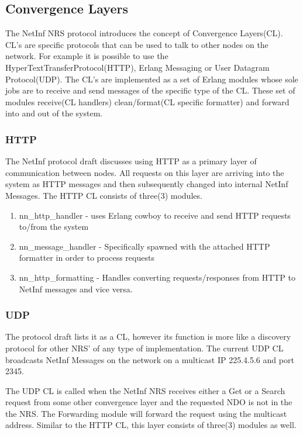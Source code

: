 \subsection {Convergence Layers}
\label{CL}
The NetInf NRS protocol introduces the concept of Convergence Layers(CL). CL's are specific protocols that can be used to talk to other nodes on the network. For example it is possible to use the HyperTextTransferProtocol(HTTP), Erlang Messaging or User Datagram Protocol(UDP). The CL's are implemented as a set of Erlang modules whose sole jobs are to receive and send messages of the specific type of the CL. These set of modules receive(CL handlers) clean/format(CL specific formatter) and forward into and out of the system.

\subsubsection{HTTP}

The NetInf protocol draft discusses using HTTP as a primary layer of communication between nodes. All requests on this layer are arriving into the system as HTTP messages and then subsequently changed into internal NetInf Messages. The HTTP CL consists of three(3) modules. 

\begin{enumerate}
\item nn\_http\_handler - uses Erlang cowboy to receive and send HTTP requests to/from the system
\item nn\_message\_handler - Specifically spawned with the attached HTTP formatter in order to process requests
\item nn\_http\_formatting - Handles converting requests/responses from HTTP to NetInf messages and vice versa.
\end{enumerate}

\subsubsection{UDP}

The protocol draft lists it as a CL, however its function is more like a discovery protocol for other NRS' of any type of implementation. The current UDP CL broadcasts NetInf Messages on the network on a multicast IP 225.4.5.6 and port 2345. 

The UDP CL is called when the NetInf NRS receives either a Get or a Search request from some other convergence layer and the requested NDO is not in the the NRS. The Forwarding module will forward the request using the multicast address. Similar to the HTTP CL, this layer consists of three(3) modules as well. 

